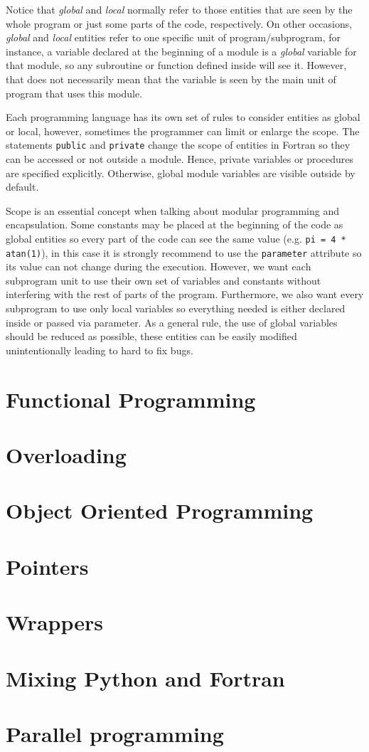 Notice that \textit{global} and \textit{local} normally refer to those entities that are seen by the whole program or just some parts of the code, respectively. 
On other occasions, \textit{global} and \textit{local} entities refer to one specific unit of program/subprogram, for instance, a variable declared at the beginning of a module is a \textit{global} variable for that module, so any subroutine or function defined inside will see it. However, that does not necessarily mean that the variable is seen by the main unit of program that uses this module. 


Each programming language has its own set of rules to consider entities as global or local, however, sometimes the programmer can limit or enlarge the scope.
The statements \texttt{public} and \texttt{private} change the scope of entities in Fortran so they can be accessed or not outside a module.
Hence, private variables or procedures are specified explicitly. Otherwise, global module variables are visible outside by default.   

Scope is an essential concept when talking about modular programming and encapsulation. Some constants may be placed at the beginning of the code as global entities so every part of the code can see the same value (e.g. \texttt{pi = 4 * atan(1)}), in this case it is strongly recommend to use the \texttt{parameter} attribute so its value can not change during the execution. However, we want each subprogram unit to use their own set of variables and constants without interfering with the rest of parts of the program. Furthermore, we also want every subprogram to use only local variables so everything needed is either declared inside or passed via parameter. 
As a general rule, the use of global variables should be reduced as possible, these entities can be easily modified unintentionally leading to hard to fix bugs.  



\section{Functional Programming}
\section{Overloading} 
\section{Object Oriented Programming}
\section{Pointers} 
\section{Wrappers} 
\section{Mixing Python and Fortran}
\section{Parallel programming} 


               